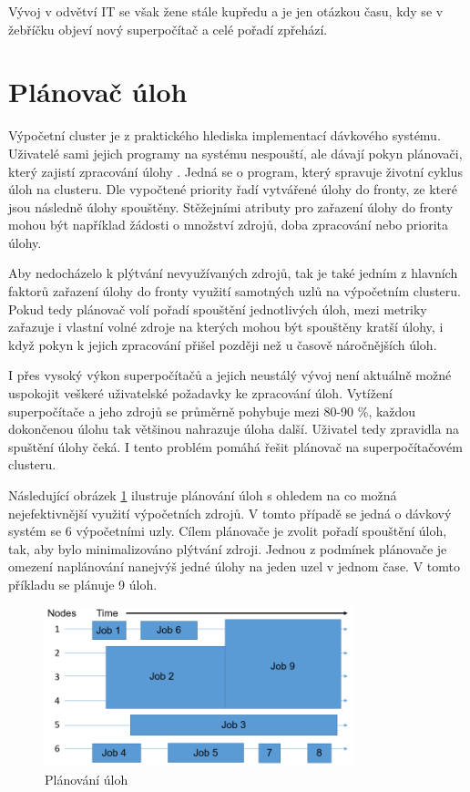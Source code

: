 Vývoj v odvětví IT se však žene stále kupředu a je jen otázkou času, kdy se v žebříčku objeví nový superpočítač a celé pořadí zpřehází.

\section{Plánovač úloh}
Výpočetní cluster je z praktického hlediska implementací dávkového systému. Uživatelé sami jejich programy na systému nespouští, ale dávají pokyn plánovači, který zajistí zpracování úlohy \cite{W94NKRaxvG2L2A1W}. Jedná se o program, který spravuje životní cyklus úloh na clusteru. Dle vypočtené priority řadí vytvářené úlohy do fronty, ze které jsou následně úlohy spouštěny. Stěžejními atributy pro zařazení úlohy do fronty mohou být například žádosti o množství zdrojů, doba zpracování nebo priorita úlohy.

Aby nedocházelo k plýtvání nevyužívaných zdrojů, tak je také jedním z hlavních faktorů zařazení úlohy do fronty využití samotných uzlů na výpočetním clusteru. Pokud tedy plánovač volí pořadí spouštění jednotlivých úloh, mezi metriky zařazuje i vlastní volné zdroje na kterých mohou být spouštěny kratší úlohy, i když pokyn k jejich zpracování přišel později než u časově náročnějších úloh.

I přes vysoký výkon superpočítačů a jejich neustálý vývoj není aktuálně možné uspokojit veškeré uživatelské požadavky ke zpracování úloh. Vytížení superpočítače a jeho zdrojů se průměrně pohybuje mezi 80-90 \%, každou dokončenou úlohu tak většinou nahrazuje úloha další. Uživatel tedy zpravidla na spuštění úlohy čeká. I tento problém pomáhá řešit plánovač na superpočítačovém clusteru. 

Následující obrázek \ref{fig:planovani-uloh} ilustruje plánování úloh s ohledem na co možná nejefektivnější využití výpočetních zdrojů. V tomto případě se jedná o dávkový systém se 6 výpočetními uzly. Cílem plánovače je zvolit pořadí spouštění úloh, tak, aby bylo minimalizováno plýtvání zdroji. Jednou z podmínek plánovače je omezení naplánování nanejvýš jedné úlohy na jeden uzel v jednom čase. V tomto příkladu se plánuje 9 úloh.

\begin{figure}[h]
	\centering
	\includegraphics[width=0.8\textwidth]{Figures/Scheduler.png}
	\caption{Plánování úloh \cite{W94NKRaxvG2L2A1W}}
	\label{fig:planovani-uloh}
\end{figure}

